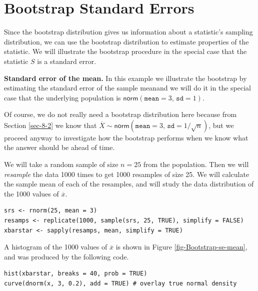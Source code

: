 \documentclass[captions=tableheading]{scrbook}
\begin{document}
\section{Bootstrap Standard Errors}
\label{sec-13-2}
\label{sec-Bootstrap-Standard-Errors}


Since the bootstrap distribution gives us information about a statistic's sampling distribution, we can use the bootstrap distribution to estimate properties of the statistic. We will illustrate the bootstrap procedure in the special case that the statistic \(S\) is a standard error. 

\begin{example}

\textbf{Standard error of the mean.}  In this example we illustrate the bootstrap by estimating the standard error of the sample meanand we will do it in the special case that the underlying population is \(\mathsf{norm}(\mathtt{mean}=3,\,\mathtt{sd}=1)\).  

Of course, we do not really need a bootstrap distribution here because from Section \ref{sec-8-2} we know that \(\overline{X}\sim\mathsf{norm}(\mathtt{mean}=3,\,\mathtt{sd}=1/\sqrt{n})\), but we proceed anyway to investigate how the bootstrap performs when we know what the answer should be ahead of time.

We will take a random sample of size \(n=25\) from the population. Then we will \emph{resample} the data 1000 times to get 1000 resamples of size 25. We will calculate the sample mean of each of the resamples, and will study the data distribution of the 1000 values of \(\overline{x}\).


\begin{verbatim}
srs <- rnorm(25, mean = 3)
resamps <- replicate(1000, sample(srs, 25, TRUE), simplify = FALSE)
xbarstar <- sapply(resamps, mean, simplify = TRUE)
\end{verbatim}

A histogram of the 1000 values of \(\overline{x}\) is shown in Figure \ref{fig-Bootstrap-se-mean}, and was produced by the following code.


\begin{verbatim}
hist(xbarstar, breaks = 40, prob = TRUE)
curve(dnorm(x, 3, 0.2), add = TRUE) # overlay true normal density
\end{verbatim}






\end{example}
\end{document}
